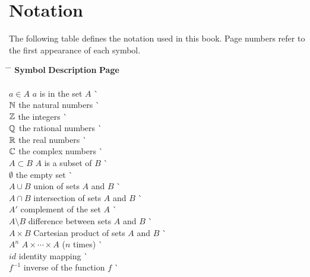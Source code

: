 \chapter*{Notation}
 
\pagestyle{myheadings}
 
The following table defines the  notation used in this book. Page numbers
refer to the first appearance of each symbol.
 
\begin{tabbing}
\hspace{1.5in} \= \hspace{2.5in} \= \kill
{\bf Symbol}  \> {\bf Description} \>  \` {\bf Page} \\ 
     \mbox{\hspace*{1in}} \\
$a \in A$ \> $a$ is in the set $A$ \> \` \pageref{setmembership} \\
${\Bbb N}$ \> the natural numbers \> \` \pageref{naturalnum} \\
${\Bbb Z}$ \> the integers \> \` \pageref{integers} \\
${\Bbb Q}$ \> the rational numbers \> \` \pageref{rationals} \\
${\Bbb R}$ \> the real numbers \> \` \pageref{reals} \\
${\Bbb C}$ \> the complex numbers \> \` \pageref{complexnum} \\
$A \subset B$ \> $A$ is a subset of $B$ \> \` \pageref{setcontain} \\
$\emptyset$ \> the empty set \> \` \pageref{theemptyset} \\
$A \cup B$ \> union of sets $A$ and $B$ \> \` \pageref{union} \\
$A \cap B$ \> intersection of sets $A$ and $B$ \> 
     \` \pageref{intersection} \\
$A'$ \> complement of the  set $A$	 \> \` \pageref{setcomplement} \\
$A \setminus B$ \> difference between sets $A$ and $B$ \>
     \` \pageref{setdifference} \\
$A \times B$ \> Cartesian product of sets $A$ and $B$ \>
     \` \pageref{cartesian} \\
$A^n$ \> $A \times \cdots \times A$ ($n$ times) \> 
     \` \pageref{ncartesian} \\
$id$ \> identity mapping \> \` \pageref{noteidentity} \\
$f^{-1}$ \> inverse of the function $f$	\> \` \pageref{inversefunc} \\

\end{tabbing}
